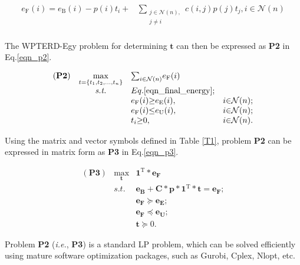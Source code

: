 \documentclass[journal,10pt]{IEEEtran}
\begin{document}
\begin{equation}
\label{eqn_final_energy}
\begin{array}{rl}
e_\text{F}(i){=}e_\text{B}(i){-}p(i)t_i
{+}&\mathop{\sum}\limits_{\substack{j{\in}\mathcal{N}(n),\\j{\neq}i}}
c(i,j)p(j)t_j,i{\in}\mathcal{N}(n)\\
\end{array}
\end{equation}

The WPTERD-Egy problem for determining $\mathbf{t}$ can then be expressed as \textbf{P2} in Eq.\eqref{eqn_p2}.

\begin{equation}
\label{eqn_p2}
\begin{array}{rcll}
(\textbf{P2})&\mathop{\max}\limits_{t{=}\{t_1,t_2,\ldots,t_n\}}&{\sum}_{i{\in}\mathcal{N}(n)}e_\text{F}(i)\\
&\textit{s.t.}
&Eq.\eqref{eqn_final_energy};&\\
&&e_\text{F}(i){\geq}e_\text{E}(i),&i{\in}\mathcal{N}(n);\\
&&e_\text{F}(i){\leq}e_\text{U}(i),&i{\in}\mathcal{N}(n);\\
&&t_i{\geq}0,&i{\in}\mathcal{N}(n).
\end{array}
\end{equation}

Using the matrix and vector symbols defined in Table \ref{T1}, problem \textbf{P2} can be expressed in matrix form as \textbf{P3} in Eq.\eqref{eqn_p3}.

\begin{equation}
\label{eqn_p3}
\begin{array}{rcl}
(\textbf{P3})&\mathop{\max}\limits_{\mathbf{t}}&\mathbf{1}^\text{T}{*}\mathbf{e_\text{F}}\\
&\textit{s.t.}
&\mathbf{e_\text{B}}{+}\mathbf{C}{*}\mathbf{p}{*}\mathbf{1}^{\text{T}}{*}\mathbf{t}{=}\mathbf{e_\text{F}};\\
&&\mathbf{e_\text{F}}{\succeq}\mathbf{e_\text{E}};\\
&&\mathbf{e_\text{F}}{\preceq}\mathbf{e_\text{U}};\\
&&\mathbf{t}{\succeq}0.
\end{array}
\end{equation}

Problem \textbf{P2} (\textit{i.e.}, \textbf{P3}) is a standard LP problem, which can be solved efficiently using mature software optimization packages, such as Gurobi, Cplex, Nlopt, etc.
\end{document}
